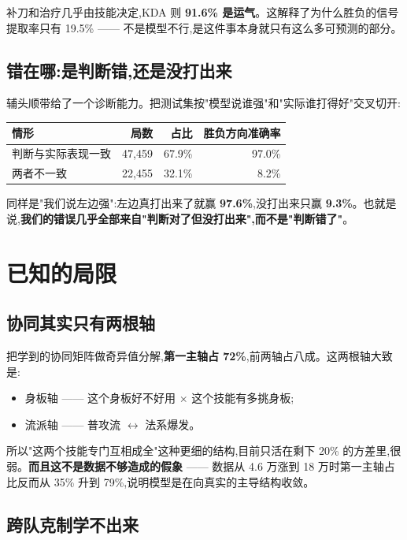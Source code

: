 \documentclass[11pt,a4paper]{article}
\newcommand{\pos}[1]{\textcolor{tealx}{#1}}
\newcommand{\negx}[1]{\textcolor{brick}{#1}}
\begin{document}
补刀和治疗几乎由技能决定,KDA 则 \textbf{91.6\% 是运气}。这解释了为什么胜负的信号提取率只有 19.5\% —— 不是模型不行,是这件事本身就只有这么多可预测的部分。

\subsection{错在哪:是判断错,还是没打出来}

辅头顺带给了一个诊断能力。把测试集按"模型说谁强"和"实际谁打得好"交叉切开:

\begin{center}
\begin{tabular}{@{}lrrr@{}}
\toprule
情形 & 局数 & 占比 & 胜负方向准确率\\
\midrule
判断与实际表现一致 & 47,459 & 67.9\% & \pos{97.0\%}\\
两者不一致 & 22,455 & 32.1\% & \negx{8.2\%}\\
\bottomrule
\end{tabular}
\end{center}

同样是"我们说左边强":左边真打出来了就赢 \textbf{97.6\%},没打出来只赢 \textbf{9.3\%}。也就是说,\textbf{我们的错误几乎全部来自"判断对了但没打出来",而不是"判断错了"}。

\section{已知的局限}

\subsection{协同其实只有两根轴}

把学到的协同矩阵做奇异值分解,\textbf{第一主轴占 72\%},前两轴占八成。这两根轴大致是:
\begin{itemize}
\item 身板轴 —— 这个身板好不好用 $\times$ 这个技能有多挑身板;
\item 流派轴 —— 普攻流 $\leftrightarrow$ 法系爆发。
\end{itemize}
所以"这两个技能专门互相成全"这种更细的结构,目前只活在剩下 20\% 的方差里,很弱。\textbf{而且这不是数据不够造成的假象} —— 数据从 4.6 万涨到 18 万时第一主轴占比反而从 35\% 升到 79\%,说明模型是在向真实的主导结构收敛。

\subsection{跨队克制学不出来}
\end{document}
